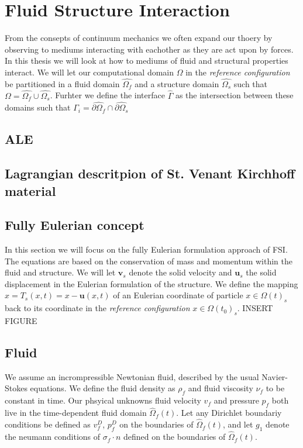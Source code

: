 \section*{Fluid Structure Interaction}
From the consepts of continuum mechanics we often expand our thoery by observing to mediums interacting with eachother as they
are act upon by forces. In this thesis we will look at how to mediums of fluid and structural properties interact. We will let our computational domain $\Omega$ in the \textit{reference configuration} be partitioned in a fluid domain $\hat{\Omega_f}$ and a structure domain $\hat{\Omega_s}$ such that
$\Omega = \hat{\Omega_f} \cup \hat{\Omega_s}$. Furhter we define the interface $\hat{\Gamma}$ as the intersection between these domains such that $\Gamma_i = \hat{\partial \Omega_f} \cap \hat{\partial \Omega_s}$ \newline \newline

\subsection*{ALE}

\subsection*{Lagrangian descritpion of St. Venant Kirchhoff material}

\subsection*{Fully Eulerian concept}
In this section we will focus on the fully Eulerian formulation approach of FSI. The equations are based on the conservation of mass and momentum within the fluid and structure.  
We will let $\textbf{v}_s$ denote the solid velocity and $\textbf{u}_s$ the solid displacement in the Eulerian formulation of the structure. We define the mapping $\hat{x} = T_s(x,t) = x - \textbf{u}(x,t)$ of an Eulerian coordinate of particle $x \in \Omega(t)_s$ back to its coordinate in the \textit{reference configuration} $x \in \Omega(t_0)_s$. \newline \newline INSERT FIGURE \newline 

\subsection*{Fluid}
We assume an incrompressible Newtonian fluid, described by the usual Navier-Stokes equations. We define the fluid density as $\rho_f$ and fluid viscosity $\nu_f$ to be constant in time. Our phsyical unknowns
fluid velocity $v_f$ and pressure $p_f$ both live in the time-dependent fluid domain  $\hat{\Omega}_f(t)$. Let any Dirichlet boundariy conditions be defined as $v_f^D$, $p_f^D$ on the boundaries
of  $\hat{\Omega}_f(t)$, and let $g_1$ denote the neumann conditions of $\sigma_f \cdot n$ defined on the boundaries of $\hat{\Omega}_f(t)$.

